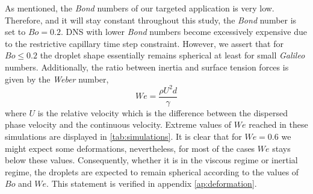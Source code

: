 As mentioned, the \textit{Bond} numbers of our targeted application is very low.
Therefore, and it will stay constant throughout this study, the \textit{Bond} number is set to $Bo = 0.2$.
DNS with lower \textit{Bond} numbers become excessively expensive due to the restrictive capillary time step constraint. 
However, we assert that for $Bo \leq 0.2$ the droplet shape essentially remains spherical at least for small \textit{Galileo} numbers. 
Additionally, the ratio between inertia and surface tension forces is given by the \textit{Weber} number, 
\begin{equation*}
    We = \frac{\rho U^2d}{\gamma}%
\end{equation*}
where $U$ is the relative velocity which is the difference between the dispersed phase velocity and the continuous velocity.%
Extreme values of $We$ reached in these simulations are displayed in \ref{tab:simulations}. 
It is clear that for $We=0.6$ we might expect some deformations, nevertheless, for most of the cases $We$ stays below these values. 
Consequently, whether it is in the viscous regime or inertial regime, the droplets are expected to remain spherical according to the values of $Bo$ and $We$.
This statement is verified in appendix \ref{ap:deformation}.%


